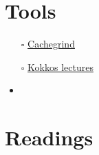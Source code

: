 \documentclass[openany, a4paper]{book}
\theoremstyle{plain}
\theoremstyle{definition}
\theoremstyle{remark}
\begin{document}
\section{Tools}
\label{sec:org539c554}

\begin{itemize}
\item[{$\square$}] \href{https://valgrind.org/docs/manual/cg-manual.html}{Cachegrind}
\item[{$\square$}] \href{https://github.com/kokkos/kokkos-tutorials/wiki/Kokkos-Lecture-Series}{Kokkos lectures}
\item
\end{itemize}


\section{Readings}
\label{sec:org5d71351}
\end{document}
